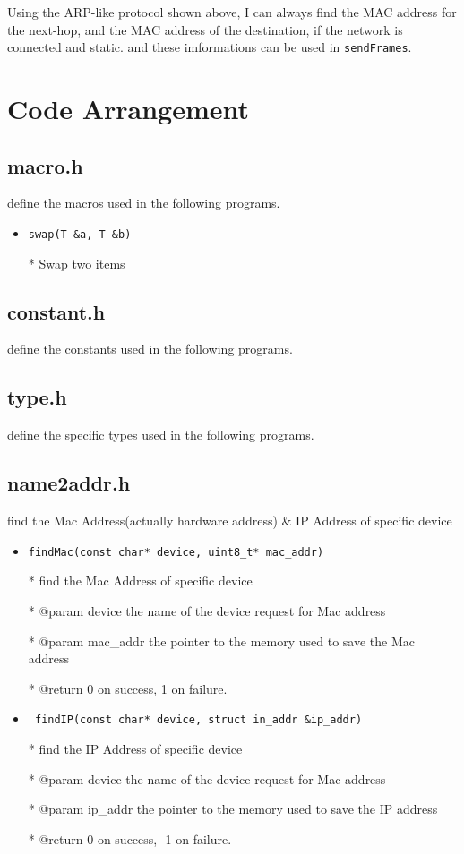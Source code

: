 \documentclass[11pt]{article}
\begin{document}
		Using the ARP-like protocol shown above, I can always find the MAC address for the next-hop, and the MAC address of the destination, if the network is connected and static. and these imformations can be used in \texttt{sendFrames}.
	
	\section{Code Arrangement}
	
	\subsection*{macro.h}
		\par define the macros used in the following programs.
		
		\begin{itemize}
		\item \texttt{swap(T \&a, T \&b)}
		
		* Swap two items
		\end{itemize}
		
	\subsection*{constant.h}
		\par define the constants used in the following programs.
		
	\subsection*{type.h}
		\par define the specific types used in the following programs.
		
	\subsection*{name2addr.h}
		\par find the Mac Address(actually hardware address) \& IP Address of specific device
	\begin{itemize}
		\item \texttt{findMac(const char* device, uint8\_t* mac\_addr)}
		
		* find the Mac Address of specific device
		
		* @param device the name of the device request for Mac address
		
		* @param mac\_addr the pointer to the memory used to save the
		Mac address
		
		* @return 0 on success, 1 on failure.
		
		\item \texttt{
			findIP(const char* device, struct in\_addr \&ip\_addr) }
		
		* find the IP Address of specific device
		
		* @param device the name of the device request for Mac address
		
		* @param ip\_addr the pointer to the memory used to save the IP address
		
		* @return 0 on success, -1 on failure.
	\end{itemize}
	
\end{document}
